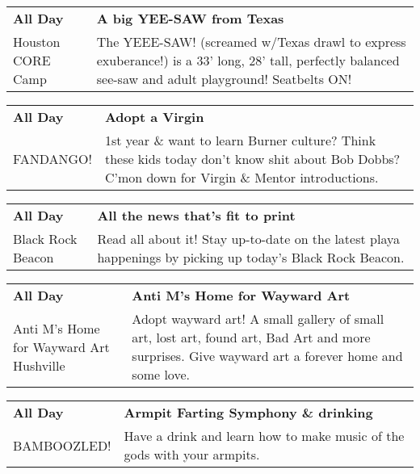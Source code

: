 \begin{tabular}{ p{1in} p{2.2in} }
    \textbf{All Day} & \textbf{A big YEE-SAW from Texas} \\
    Houston CORE Camp \newline  & The YEEE-SAW! (screamed w/Texas drawl to express exuberance!) is a 33' long, 28' tall, perfectly balanced see-saw and adult playground! Seatbelts ON! \\
    \hline 
\end{tabular}
    
\begin{tabular}{ p{1in} p{2.2in} }
    \textbf{All Day} & \textbf{Adopt a Virgin} \\
    FANDANGO! \newline  & 1st year \& want to learn Burner culture? Think these kids today don't know shit about Bob Dobbs? C'mon down for Virgin \& Mentor introductions. \\
    \hline 
\end{tabular}
    
\begin{tabular}{ p{1in} p{2.2in} }
    \textbf{All Day} & \textbf{All the news that's fit to print} \\
    Black Rock Beacon \newline  & Read all about it! Stay up-to-date on the latest playa happenings by picking up today's Black Rock Beacon. \\
    \hline 
\end{tabular}
    
\begin{tabular}{ p{1in} p{2.2in} }
    \textbf{All Day} & \textbf{Anti M's Home for Wayward Art} \\
    Anti M's Home for Wayward Art \newline Hushville & Adopt wayward art! A small gallery of small art, lost art, found art, Bad Art and more surprises.  Give wayward art a forever home and some love. \\
    \hline 
\end{tabular}
    
\begin{tabular}{ p{1in} p{2.2in} }
    \textbf{All Day} & \textbf{Armpit Farting Symphony \& drinking} \\
    BAMBOOZLED! \newline  & Have a drink and learn how to make music of the gods with your armpits. \\
    \hline 
\end{tabular}
    
